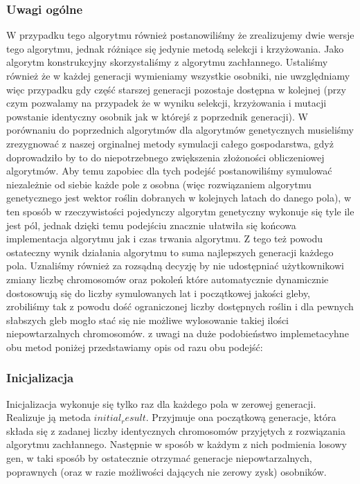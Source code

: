 \documentclass{article}
\begin{document}
\subsubsection{Uwagi ogólne}
W przypadku tego algorytmu również postanowiliśmy że zrealizujemy dwie wersje tego algorytmu, jednak różniące się jedynie metodą selekcji i krzyżowania. Jako algorytm konstrukcyjny skorzystaliśmy z algorytmu zachłannego. Ustaliśmy również że w każdej generacji wymieniamy wszystkie osobniki, nie uwzględniamy więc przypadku gdy część starszej generacji  pozostaje dostępna w kolejnej (przy czym pozwalamy na przypadek że w wyniku selekcji, krzyżowania i mutacji powstanie identyczny osobnik jak w którejś z poprzednik generacji).
W porównaniu do poprzednich algorytmów dla algorytmów genetycznych musieliśmy zrezygnować z  naszej orginalnej metody symulacji całego gospodarstwa, gdyż doprowadziło by to do niepotrzebnego zwiększenia złożoności obliczeniowej algorytmów. Aby temu zapobiec dla tych podejść postanowiliśmy symulować niezależnie od siebie każde pole z osobna (więc rozwiązaniem algorytmu genetycznego jest wektor roślin dobranych w kolejnych latach do danego pola), w ten sposób w rzeczywistości pojedynczy algorytm genetyczny wykonuje się tyle ile jest pól, jednak dzięki temu podejściu znacznie ułatwiła się końcowa implementacja algorytmu jak i czas trwania algorytmu. Z tego też powodu ostateczny wynik działania algorytmu to suma najlepszych generacji każdego pola.  Uznaliśmy również za rozsądną decyzję by nie udostępniać użytkownikowi zmiany liczbę chromosomów oraz pokoleń które automatycznie dynamicznie dostosowują  się do liczby symulowanych lat i początkowej jakości gleby, zrobiliśmy tak z powodu dość ograniczonej liczby dostępnych roślin i dla pewnych słabszych gleb mogło stać się nie możliwe wylosowanie takiej ilości niepowtarzalnych chromosomów. z uwagi na duże podobieństwo implemetacyhne obu metod poniżej przedstawiamy opis od razu obu podejść:

\subsubsection{Inicjalizacja}
Inicjalizacja wykonuje się tylko raz dla każdego pola w zerowej generacji.
Realizuje ją metoda $initial_result$. Przyjmuje ona początkową generacje, która składa się z zadanej liczby identycznych chromosomów przyjętych z rozwiązania algorytmu zachłannego. Następnie w sposób w każdym z nich podmienia losowy gen, w taki sposób by ostatecznie otrzymać generacje niepowtarzalnych, poprawnych (oraz w razie możliwości dających nie zerowy zysk) osobników.
\end{document}
